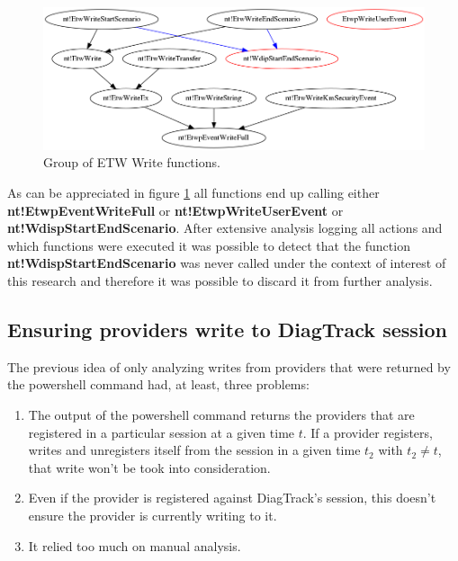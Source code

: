 \begin{centering}
  \begin{figure}[H]
    \includegraphics[width=15cm]{images/write_functions.png}
    \caption[]{Group of ETW Write functions.}
    \label{fig:etw_write_group_functions}
  \end{figure}
\end{centering}

As can be appreciated in figure \ref{fig:etw_write_group_functions} all functions end up calling  either {\bfseries nt!EtwpEventWriteFull} or {\bfseries nt!EtwpWriteUserEvent} or {\bfseries nt!WdispStartEndScenario}. After extensive analysis logging all actions and which functions were executed it was possible to detect that the function {\bfseries nt!WdispStartEndScenario} was never called under the context of interest of this research and therefore it was possible to discard it from further analysis. 


\subsection{\bfseries{Ensuring providers write to DiagTrack session}}
The previous idea of only analyzing writes from providers that were returned by the powershell command had, at least, three problems:

\begin{enumerate}
\setlength\itemsep{0.05em}
  \item The output of the powershell command returns the providers that are registered in a particular session at a given time $t$. If a provider registers, writes and unregisters itself from the session in a given time $t_2$ with $t_2 \neq t$, that write won't be took into consideration.
  \item Even if the provider is registered against DiagTrack's session, this doesn't ensure the provider is currently writing to it.
  \item It relied too much on manual analysis.
\end{enumerate}

